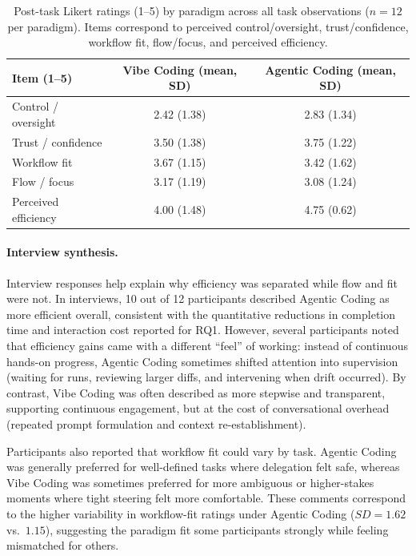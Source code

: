 \begin{table}[H]
  \centering
  \caption[Post-task Likert ratings by paradigm]{Post-task Likert ratings (1--5) by paradigm across all task observations ($n=12$ per paradigm). Items correspond to perceived control/oversight, trust/confidence, workflow fit, flow/focus, and perceived efficiency.}
  \label{tab:rq2-likert}
  \renewcommand{\arraystretch}{1.15}
  \begin{tabular}{lcc}
    \toprule
    \rowcolor{accentblue}
    \textbf{Item (1--5)} & \textbf{Vibe Coding (mean, SD)} & \textbf{Agentic Coding (mean, SD)} \\
    \midrule
    Control / oversight & 2.42 (1.38) & 2.83 (1.34) \\
    Trust / confidence & 3.50 (1.38) & 3.75 (1.22) \\
    Workflow fit & 3.67 (1.15) & 3.42 (1.62) \\
    Flow / focus & 3.17 (1.19) & 3.08 (1.24) \\
    Perceived efficiency & 4.00 (1.48) & 4.75 (0.62) \\
    \bottomrule
  \end{tabular}
\end{table}

\paragraph{Interview synthesis.}

Interview responses help explain why efficiency was separated while flow and fit were not. In interviews, 10 out of 12 participants described Agentic Coding as more efficient overall, consistent with the quantitative reductions in completion time and interaction cost reported for RQ1. However, several participants noted that efficiency gains came with a different ``feel'' of working: instead of continuous hands-on progress, Agentic Coding sometimes shifted attention into supervision (waiting for runs, reviewing larger diffs, and intervening when drift occurred). By contrast, Vibe Coding was often described as more stepwise and transparent, supporting continuous engagement, but at the cost of conversational overhead (repeated prompt formulation and context re-establishment).

Participants also reported that workflow fit could vary by task. Agentic Coding was generally preferred for well-defined tasks where delegation felt safe, whereas Vibe Coding was sometimes preferred for more ambiguous or higher-stakes moments where tight steering felt more comfortable. These comments correspond to the higher variability in workflow-fit ratings under Agentic Coding ($SD=1.62$ vs.\ $1.15$), suggesting the paradigm fit some participants strongly while feeling mismatched for others.

